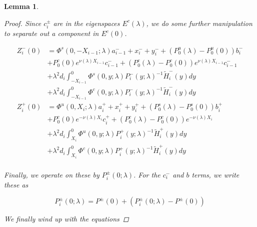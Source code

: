 \documentclass[12pt]{article}
\newtheorem{lemma}{Lemma}
\begin{document}
\begin{lemma}
\begin{proof}
Since $c_i^\pm$ are in the eigenspaces $E^c(\lambda)$, we do some further manipulation to separate out a component in $E^c(0)$.

\begin{align*}
Z_i^-(0) &= \Phi^s(0, -X_{i-1}; \lambda) a_{i-1}^- + x_i^- + y_i^- + (P_0^u(\lambda) - P_0^u(0))b_i^- \\
&+ P_0^c(0) e^{\nu(\lambda) X_{i-1}} c_{i-1}^- + (P_0^c(\lambda) - P_0^c(0)) e^{\nu(\lambda) X_{i-1}} c_{i-1}^- \\
&+ \lambda^2 d_i \int_{-X_{i-1}}^0 \Phi^s(0, y; \lambda) P_i^-(y; \lambda)^{-1} \tilde{H}_i^-(y) dy \\
&+ \lambda^2 d_i \int_{-X_{i-1}}^0 \Phi^c(0, y; \lambda) P_i^-(y; \lambda)^{-1} \tilde{H}_i^-(y) dy  \\ 
Z_i^+(0) &= \Phi^u(0, X_i; \lambda) a_i^+ + x_i^+ + y_i^+ + (P_0^s(\lambda) - P_0^s(0)) b_i^+ \\
&+ P_0^c(0) e^{-\nu(\lambda)X_i} c_i^+ + (P_0^c(\lambda) - P_0^c(0)) e^{-\nu(\lambda)X_i} \\
&+ \lambda^2 d_i \int_{X_i}^0 \Phi^u(0, y; \lambda) P_i^+(y; \lambda)^{-1} \tilde{H}_i^+(y) dy \\
&+ \lambda^2 d_i \int_{X_i}^0 \Phi^c(0, y; \lambda) P_i^+(y; \lambda)^{-1} \tilde{H}_i^+(y) dy \\
\end{align*}

Finally, we operate on these by $P_i^\pm(0; \lambda)$. For the $c_i^-$ and $b$ terms, we write these as

\[
P_i^\pm(0; \lambda) = P^\pm(0) + (P_i^\pm(0; \lambda) - P^\pm(0))
\]

We finally wind up with the equations


\end{proof}
\end{lemma}
\end{document}
